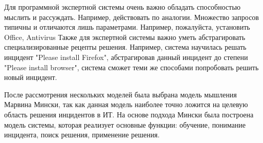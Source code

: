 Для программной экспертной системы очень важно обладать способностью мыслить и рассуждать. Например, действовать по аналогии. Множество запросов типичны и отличаются лишь параметрами. Например, пожалуйста, установить Office, Antivirus \etc Также для экспертной системы важно уметь абстрагировать специализированные рецепты решения. Например, система научилась решать инцидент "Please install Firefox", абстрагировав данный инцидент до степени "Please install browser", система сможет теми же способами попробовать решить новый инцидент.\par
После рассмотрения нескольких моделей была выбрана модель мышления Марвина Мински, так как данная модель наиболее точно ложится на целевую область решения инцидентов в ИТ. На основе подхода Мински была построена модель системы, которая реализует основные функции: обучение, понимание инцидента, поиск решения, применение решения. 

